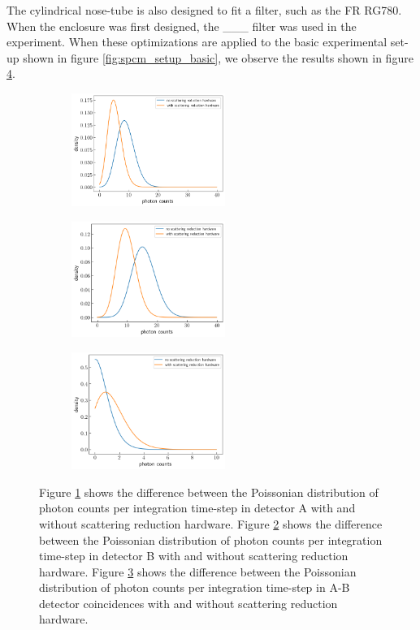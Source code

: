 \documentclass[letterpaper, 11 pt]{book}
\begin{document}
The cylindrical nose-tube is also designed to fit a filter, such as the FR
RG780. When the enclosure was first designed, the \_\_\_ filter was used in the
experiment. When these optimizations are applied to the basic experimental
set-up shown in figure \ref{fig:spcm_setup_basic}, we observe the results shown
in figure \ref{fig:scatter_reduce}.
\begin{figure}[H]%
    \centering
    \begin{subfigure}{.3\textwidth}
    \includegraphics[width=5cm]{ch1_scatter.png}
    \caption{ }
    \label{fig:1}
    \end{subfigure}
    \begin{subfigure}{.3\textwidth}
    \includegraphics[width = 5cm]{ch2_scatter.png}
    \caption{ }
    \label{fig:2}
    \end{subfigure}
    \begin{subfigure}{.3\textwidth}
    \includegraphics[width = 5cm]{cc_scatter.png}
    \caption{ }
    \label{fig:cc}
    \end{subfigure}
    \caption{Figure \ref{fig:1} shows the difference between the Poissonian
    distribution of photon counts per integration time-step in detector A with
    and without scattering reduction hardware. Figure \ref{fig:2} shows the
    difference between the Poissonian distribution of photon counts per
    integration time-step in detector B with and without scattering reduction
    hardware. Figure \ref{fig:cc} shows the difference between the Poissonian
    distribution of photon counts per integration time-step in A-B detector
    coincidences with and without scattering reduction hardware.}
    \label{fig:scatter_reduce}
\end{figure}
\end{document}

